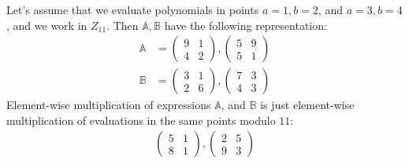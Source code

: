 Let's assume that we evaluate polynomials in points $a = 1, b = 2$, and $a = 3, b = 4$, and we work in $Z_{11}$.
Then $\mathbb{A}, \mathbb{B}$ have the following representation:
\begin{align*}
\mathbb{A} &= \begin{pmatrix} 9 & 1\\ 4 & 2 \end{pmatrix}, \begin{pmatrix} 5 & 9\\ 5 & 1 \end{pmatrix} \\
\mathbb{B} &= \begin{pmatrix} 3 & 1\\ 2 & 6 \end{pmatrix}, \begin{pmatrix} 7 & 3\\ 4 & 3 \end{pmatrix}
\end{align*}
Element-wise multiplication of expressions $\mathbb{A}$, and $\mathbb{B}$ is just element-wise multiplication of evaluations
in the same points modulo $11$:
\begin{align*}
\begin{pmatrix} 5 & 1\\ 8 & 1 \end{pmatrix}, \begin{pmatrix} 2 & 5\\ 9 & 3 \end{pmatrix}
\end{align*}

